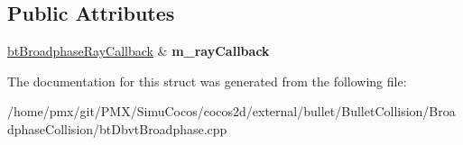 \subsection*{Public Attributes}
\begin{DoxyCompactItemize}
\item 
\mbox{\label{structBroadphaseRayTester_adefb860129739c77c01a78b3b9515081}} 
\hyperlink{structbtBroadphaseRayCallback}{bt\+Broadphase\+Ray\+Callback} \& {\bfseries m\+\_\+ray\+Callback}
\end{DoxyCompactItemize}


The documentation for this struct was generated from the following file\+:\begin{DoxyCompactItemize}
\item 
/home/pmx/git/\+P\+M\+X/\+Simu\+Cocos/cocos2d/external/bullet/\+Bullet\+Collision/\+Broadphase\+Collision/bt\+Dbvt\+Broadphase.\+cpp\end{DoxyCompactItemize}
